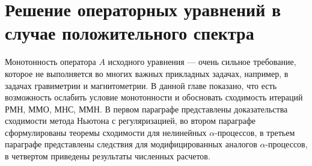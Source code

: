 \chapter{Решение операторных уравнений в случае положительного спектра}
Монотонность оператора $A$ исходного уравнения --- очень сильное требование, которое не выполняется во многих важных прикладных задачах, например, в задачах гравиметрии и магнитометрии. В данной главе показано, что есть возможность ослабить условие монотонности и обосновать сходимость итераций РМН, ММО, МНС, ММН.
В первом параграфе представлены доказательства сходимости метода Ньютона с регуляризацией, во втором параграфе сформулированы теоремы сходимости для нелинейных $\alpha$-процессов, в третьем параграфе представлены следствия для модифицированных аналогов $\alpha$-процессов, в четвертом приведены результаты численных расчетов.

\newpage
